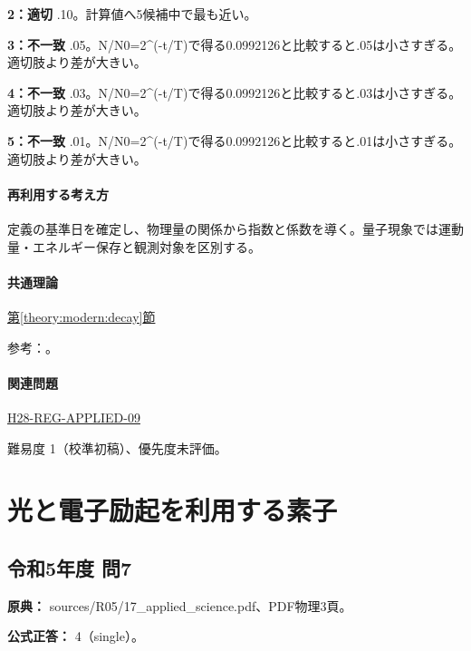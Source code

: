 \noindent\textbf{2：適切} .10。計算値へ5候補中で最も近い。\par

\noindent\textbf{3：不一致} .05。N/N0=\allowbreak{}2\textasciicircum{}(-t/T)で得る0.0992126と比較すると.05は小さすぎる。 適切肢より差が大きい。\par

\noindent\textbf{4：不一致} .03。N/N0=\allowbreak{}2\textasciicircum{}(-t/T)で得る0.0992126と比較すると.03は小さすぎる。 適切肢より差が大きい。\par

\noindent\textbf{5：不一致} .01。N/N0=\allowbreak{}2\textasciicircum{}(-t/T)で得る0.0992126と比較すると.01は小さすぎる。 適切肢より差が大きい。\par

\paragraph{再利用する考え方} 定義の基準日を確定し、物理量の関係から指数と係数を導く。量子現象では運動量・エネルギー保存と観測対象を区別する。

\paragraph{共通理論} \hyperref[theory:modern:decay]{第\ref*{theory:modern:decay}節}

\par 参考：\cite{modern_mit_nuclear}。

\paragraph{関連問題} \hyperref[q:h28-reg-applied-09]{H28-REG-APPLIED-09}

\par 難易度 1（校準初稿）、優先度未評価。

\section{光と電子励起を利用する素子}

\subsection{令和5年度 問7}
\label{q:r05-reg-applied-07}

\noindent\textbf{原典：} sources/R05/17\_applied\_science.pdf、PDF物理3頁。

\textbf{公式正答：} 4（single）。


